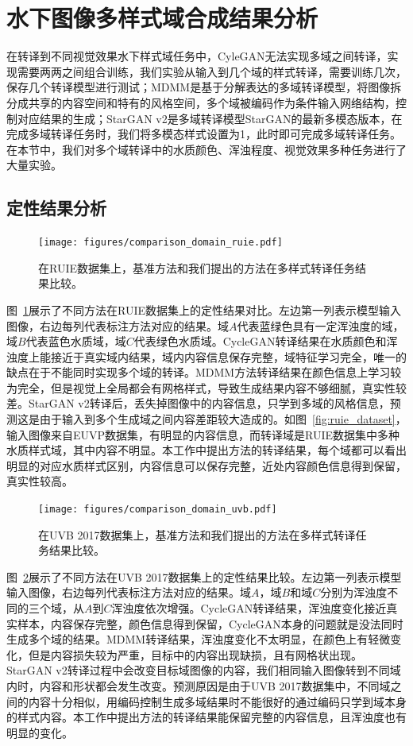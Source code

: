 \section{水下图像多样式域合成结果分析}
在转译到不同视觉效果水下样式域任务中，CyleGAN无法实现多域之间转译，实现需要两两之间组合训练，我们实验从输入到几个域的样式转译，需要训练几次，保存几个转译模型进行测试；MDMM是基于分解表达的多域转译模型，将图像拆分成共享的内容空间和特有的风格空间，多个域被编码作为条件输入网络结构，控制对应结果的生成；StarGAN v2是多域转译模型StarGAN的最新多模态版本，在完成多域转译任务时，我们将多模态样式设置为1，此时即可完成多域转译任务。在本节中，我们对多个域转译中的水质颜色、浑浊程度、视觉效果多种任务进行了大量实验。

\subsection{定性结果分析}
\begin{figure}[htp]
    \centering
  \texttt{[image: figures/comparison\_domain\_ruie.pdf]}
  \caption{在RUIE数据集上，基准方法和我们提出的方法在多样式转译任务结果比较。}
  \label{fig:comparison_domain_ruie}
\end{figure}

图~\ref{fig:comparison_domain_ruie}展示了不同方法在RUIE数据集上的定性结果对比。左边第一列表示模型输入图像，右边每列代表标注方法对应的结果。域$A$代表蓝绿色具有一定浑浊度的域，域$B$代表蓝色水质域，域$C$代表绿色水质域。CycleGAN转译结果在水质颜色和浑浊度上能接近于真实域内结果，域内内容信息保存完整，域特征学习完全，唯一的缺点在于不能同时实现多个域的转译。MDMM方法转译结果在颜色信息上学习较为完全，但是视觉上全局都会有网格样式，导致生成结果内容不够细腻，真实性较差。StarGAN v2转译后，丢失掉图像中的内容信息，只学到多域的风格信息，预测这是由于输入到多个生成域之间内容差距较大造成的。如图~\ref{fig:ruie_dataset}，输入图像来自EUVP数据集，有明显的内容信息，而转译域是RUIE数据集中多种水质样式域，其中内容不明显。本工作中提出方法的转译结果，每个域都可以看出明显的对应水质样式区别，内容信息可以保存完整，近处内容颜色信息得到保留，真实性较高。

\begin{figure}[htp]
    \centering
  \texttt{[image: figures/comparison\_domain\_uvb.pdf]}
  \caption{在UVB 2017数据集上，基准方法和我们提出的方法在多样式转译任务结果比较。}
  \label{fig:comparison_domain_uvb}
\end{figure}

图~\ref{fig:comparison_domain_uvb}展示了不同方法在UVB 2017数据集上的定性结果比较。左边第一列表示模型输入图像，右边每列代表标注方法对应的结果。域$A$，域$B$和域$C$分别为浑浊度不同的三个域，从$A$到$C$浑浊度依次增强。CycleGAN转译结果，浑浊度变化接近真实样本，内容保存完整，颜色信息得到保留，CycleGAN本身的问题就是没法同时生成多个域的结果。MDMM转译结果，浑浊度变化不太明显，在颜色上有轻微变化，但是内容损失较为严重，目标中的内容出现缺损，且有网格状出现。StarGAN v2转译过程中会改变目标域图像的内容，我们相同输入图像转到不同域内时，内容和形状都会发生改变。预测原因是由于UVB 2017数据集中，不同域之间的内容十分相似，用编码控制生成多域结果时不能很好的通过编码只学到域本身的样式内容。本工作中提出方法的转译结果能保留完整的内容信息，且浑浊度也有明显的变化。

